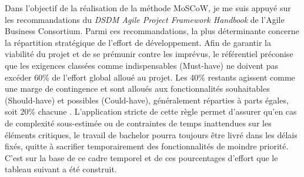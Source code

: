 \documentclass[12pt]{article}
\begin{document}
Dans l'objectif de la réalisation de la méthode MoSCoW, je me suis appuyé sur les recommandations du \textit{DSDM Agile Project Framework Handbook} de l'Agile Business Consortium. Parmi ces recommandations, la plus déterminante concerne la répartition stratégique de l'effort de développement. 
\newline\newline
Afin de garantir la viabilité du projet et de se prémunir contre les imprévus, le référentiel préconise que les exigences classées comme indispensables (Must-have) ne doivent pas excéder 60\% de l'effort global alloué au projet. Les 40\% restants agissent comme une marge de contingence et sont alloués aux fonctionnalités souhaitables (Should-have) et possibles (Could-have), généralement réparties à parts égales, soit 20\% chacune \parencite{agile_business_consortium_what_2026}.
\newline\newline
L'application stricte de cette règle permet d'assurer qu'en cas de complexité sous-estimée ou de contraintes de temps inattendues sur les éléments critiques, le travail de bachelor pourra toujours être livré dans les délais fixés, quitte à sacrifier temporairement des fonctionnalités de moindre priorité. C'est sur la base de ce cadre temporel et de ces pourcentages d'effort que le tableau suivant a été construit.
\end{document}
